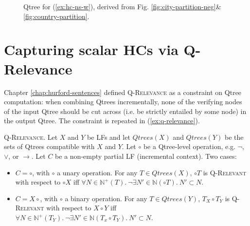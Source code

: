 	
		\begin{figure}[H]
			\centering
			\caption{Qtree for (\ref{ex:hc-ns-w}), derived from Fig. \ref{fig:city-partition-neg}\&\ref{fig:country-partition}.}\label{fig:hc-non-scalar-ns-w}
		\end{figure}
	
	\section{Capturing scalar HCs via Q-Relevance}
	Chapter \ref{chap:hurford-sentences} defined \textsc{Q-Relevance} as a constraint on Qtree computation: when combining Qtrees incrementally, none of the verifying nodes of the input Qtree should be cut across (i.e. be strictly entailed by some node) in the output Qtree. The constraint is repeated in (\ref{ex:q-relevance}).
	
	
	\begin{exe}
		 {\textsc{Q-Relevance}.  Let $X$ and $Y$ be LFs and let $Qtrees(X)$ and $Qtrees(Y)$ be the sets of Qtrees compatible with $X$ and $Y$. Let $\circ$ be a Qtree-level operation, e.g. $\neg$, $\vee$, or $\rightarrow$. Let $C$ be a non-empty partial LF (incremental context). Two cases:
			\begin{itemize}
				\item $C=\circ$, with $\circ$ a unary operation. For any $T \in Qtrees(X)$, $\circ T$ is \textsc{Q-Relevant} with respect to $\circ X$ iff $\forall N \in \mathbb{N}^+(T). \ \neg\exists N' \in \mathbb{N}(\circ T). \ N' \subset N$.
				\item $C = X \circ$, with $\circ$ a binary operation. For any $T \in Qtrees(Y)$, $T_X \circ T_Y$ is \textsc{Q-Relevant} with respect to $X \circ Y$ iff $\forall N \in \mathbb{N}^+(T_Y). \ \neg\exists N' \in \mathbb{N}(T_x \circ T_Y). \ N' \subset N$.
		\end{itemize}}
	\end{exe}
	
